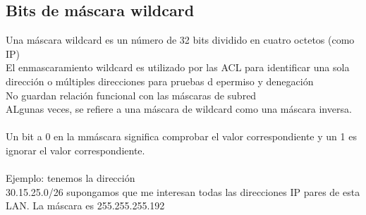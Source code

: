 \subsection{Bits de máscara wildcard}
Una máscara wildcard es un número de 32 bits dividido en cuatro octetos (como IP)\\
El enmascaramiento wildcard es utilizado por las ACL para identificar una sola dirección o múltiples direcciones para pruebas d epermiso y denegación\\ 
No guardan relación funcional con las máscaras de subred\\
ALgunas veces, se refiere a una máscara de wildcard como una máscara inversa.\\\\

Un bit a 0 en la mmáscara significa comprobar el valor correspondiente y un 1 es ignorar el valor correspondiente.\\\\
Ejemplo: tenemos la dirección \\
30.15.25.0/26 supongamos que me interesan todas las direcciones IP pares de esta LAN. La máscara es 255.255.255.192\\\\

